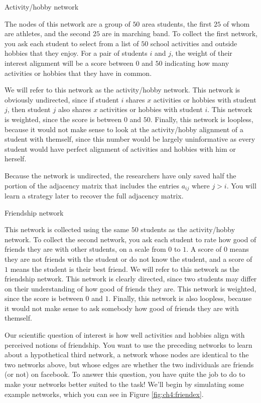 \begin{floatingbox}[h]\caption{Activity/hobby network}
The nodes of this network are a group of $50$ area students, the first $25$ of whom are athletes, and the second $25$ are in marching band. To collect the first network, you ask each student to select from a list of $50$ school activities and outside hobbies that they enjoy. For a pair of students $i$ and $j$, the weight of their interest alignment will be a score between $0$ and $50$ indicating how many activities or hobbies that they have in common. 

We will refer to this network as the activity/hobby network. This network is obviously undirected, since if student $i$ shares $x$ activities or hobbies with student $j$, then student $j$ also shares $x$ activities or hobbies with student $i$. This network is weighted, since the score is between $0$ and $50$. Finally, this network is loopless, because it would not make sense to look at the activity/hobby alignment of a student with themself, since this number would be largely uninformative as every student would have perfect alignment of activities and hobbies with him or herself. 

Because the network is undirected, the researchers have only saved half the portion of the adjacency matrix that includes the entries $a_{ij}$ where $j > i$. You will learn a strategy later to recover the full adjacency matrix.
\end{floatingbox}

\begin{floatingbox}[h]\caption{Friendship network}
This network is collected using the same $50$ students as the activity/hobby network. To collect the second network, you ask each student to rate how good of friends they are with other students, on a scale from $0$ to $1$. A score of $0$ means they are not friends with the student or do not know the student, and a score of $1$ means the student is their best friend. We will refer to this network as the friendship network. This network is clearly directed, since two students may differ on their understanding of how good of friends they are. This network is weighted, since the score is between $0$ and $1$. Finally, this network is also loopless, because it would not make sense to ask somebody how good of friends they are with themself.
\end{floatingbox}

Our scientific question of interest is how well activities and hobbies align with perceived notions of friendship. You want to use the preceding networks to learn about a hypothetical third network, a network whose nodes are identical to the two networks above, but whose edges are whether the two individuals are friends (or not) on facebook. To answer this question, you have quite the job to do to make your networks better suited to the task! We'll begin by simulating some example networks, which you can see in Figure \ref{fig:ch4:friendex}.

